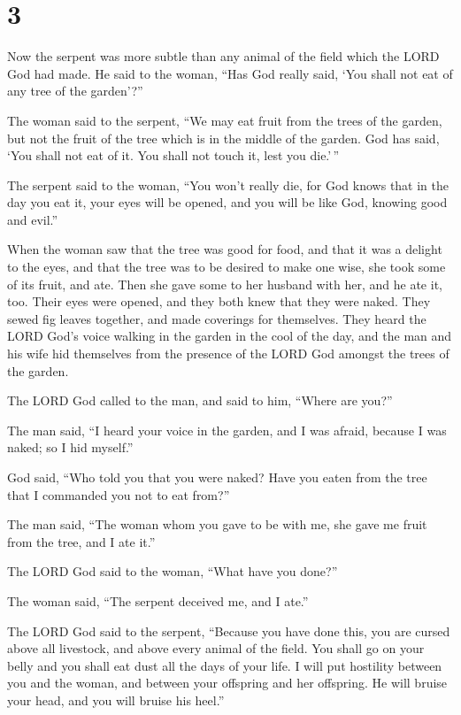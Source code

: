 \hypertarget{section-2}{%
\section{3}\label{section-2}}

 Now the serpent was more subtle than any animal of the
field which the LORD God had made. He said to the woman, ``Has God
really said, `You shall not eat of any tree of the garden'?''

 The woman said to the serpent, ``We may eat fruit from the
trees of the garden,  but not the fruit of the tree which is
in the middle of the garden. God has said, `You shall not eat of it. You
shall not touch it, lest you die.'\,''

 The serpent said to the woman, ``You won't really die,
 for God knows that in the day you eat it, your eyes will be
opened, and you will be like God, knowing good and evil.''

 When the woman saw that the tree was good for food, and
that it was a delight to the eyes, and that the tree was to be desired
to make one wise, she took some of its fruit, and ate. Then she gave
some to her husband with her, and he ate it, too.  Their
eyes were opened, and they both knew that they were naked. They sewed
fig leaves together, and made coverings for themselves. 
They heard the LORD God's voice walking in the garden in the cool of the
day, and the man and his wife hid themselves from the presence of the
LORD God amongst the trees of the garden.

 The LORD God called to the man, and said to him, ``Where
are you?''

 The man said, ``I heard your voice in the garden, and I
was afraid, because I was naked; so I hid myself.''

 God said, ``Who told you that you were naked? Have you
eaten from the tree that I commanded you not to eat from?''

 The man said, ``The woman whom you gave to be with me, she
gave me fruit from the tree, and I ate it.''

 The LORD God said to the woman, ``What have you done?''

The woman said, ``The serpent deceived me, and I ate.''

 The LORD God said to the serpent, ``Because you have done
this, you are cursed above all livestock, and above every animal of the
field. You shall go on your belly and you shall eat dust all the days of
your life.  I will put hostility between you and the woman,
and between your offspring and her offspring. He will bruise your head,
and you will bruise his heel.''

